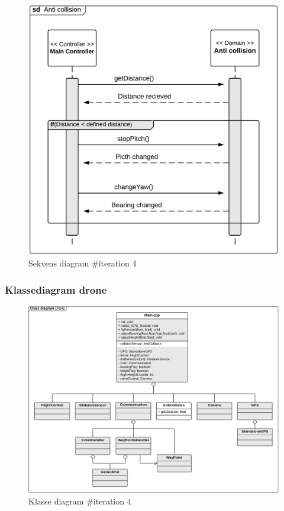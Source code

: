 \begin{figure}[H]
	\centering
	\includegraphics[width=1\textwidth]{Billeder/sekvens/sekvens_iteration4}
	\caption{Sekvens diagram \#iteration 4}
	\label{fig:Sekvens_diagram_iteration4}
\end{figure}


\subsubsection*{Klassediagram drone}
\vspace{-0.1cm}

\begin{figure}[H]
	\centering
	\includegraphics[width=1\textwidth]{Billeder/klasse_diagrammer/classdiagram_iteration4_drone.png}
	\vspace{-0.5cm}
	\caption{Klasse diagram \#iteration 4}
	\label{fig:classDiagram_iteration4}
\end{figure}


